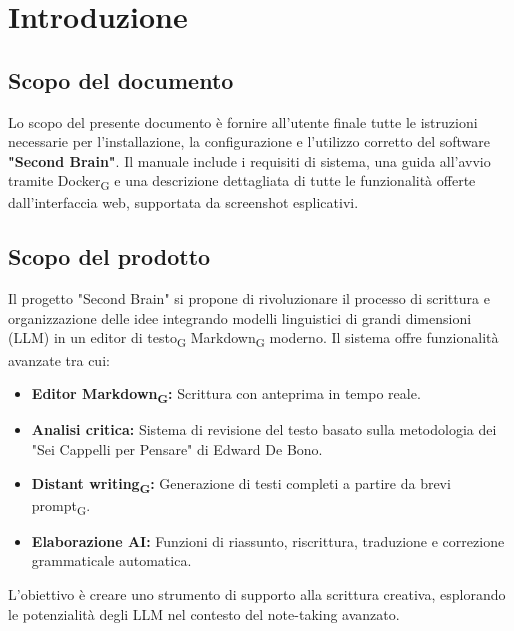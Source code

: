 \documentclass[11pt,a4paper]{article}
\newcommand{\gls}[1]{#1\textsubscript{G}}
\begin{document}
\newpage

\tableofcontents
\thispagestyle{empty}
\newpage

\setcounter{page}{1}

\section{Introduzione}
\subsection{Scopo del documento}
Lo scopo del presente documento è fornire all'utente finale tutte le istruzioni necessarie per l'installazione, la configurazione e l'utilizzo corretto del software \textbf{"Second Brain"}.  Il manuale include i requisiti di sistema, una guida all'avvio tramite \gls{Docker} e una descrizione dettagliata di tutte le funzionalità offerte dall'interfaccia web, supportata da screenshot esplicativi.

\subsection{Scopo del prodotto}
Il progetto "Second Brain" si propone di rivoluzionare il processo di scrittura e organizzazione delle idee integrando modelli linguistici di grandi dimensioni (LLM) in un \gls{editor di testo} \gls{Markdown} moderno. 
Il sistema offre funzionalità avanzate tra cui:
\begin{itemize}
    \item \textbf{Editor \gls{Markdown}:} Scrittura con anteprima in tempo reale.
    \item \textbf{Analisi critica:} Sistema di revisione del testo basato sulla metodologia dei "Sei Cappelli per Pensare" di Edward De Bono.
    \item \textbf{\gls{Distant writing}:} Generazione di testi completi a partire da brevi \gls{prompt}.
    \item \textbf{Elaborazione AI:} Funzioni di riassunto, riscrittura, traduzione e correzione grammaticale automatica.
\end{itemize}

L’obiettivo è creare uno strumento di supporto alla scrittura creativa, esplorando le potenzialità degli LLM nel contesto del note-taking avanzato.
\end{document}
